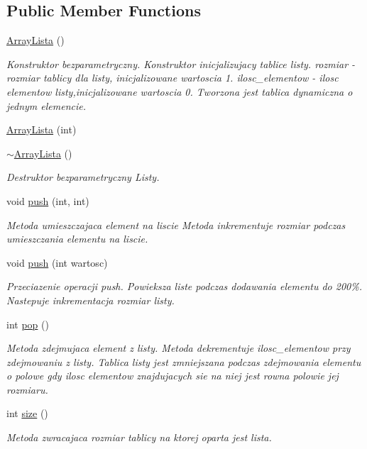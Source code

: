 \subsection*{Public Member Functions}
\begin{DoxyCompactItemize}
\item 
\hyperlink{a00008_a645d18dcf43d2f3397d0ba90f5d8d0b4}{Array\+Lista} ()
\begin{DoxyCompactList}\small\item\em Konstruktor bezparametryczny. Konstruktor inicjalizujacy tablice listy. rozmiar -\/ rozmiar tablicy dla listy, inicjalizowane wartoscia 1. ilosc\+\_\+elementow -\/ ilosc elementow listy,inicjalizowane wartoscia 0. Tworzona jest tablica dynamiczna o jednym elemencie. \end{DoxyCompactList}\item 
\hyperlink{a00008_a0bf8b1be3beb5a7783df8fe555e24e6c}{Array\+Lista} (int)
\item 
\hyperlink{a00008_ab502f9c0ea71ec66954ebe675100b9ce}{$\sim$\+Array\+Lista} ()
\begin{DoxyCompactList}\small\item\em Destruktor bezparametryczny Listy. \end{DoxyCompactList}\item 
void \hyperlink{a00008_a473a71ed888097c7b14bb70cbf7eecd6}{push} (int, int)
\begin{DoxyCompactList}\small\item\em Metoda umieszczajaca element na liscie Metoda inkrementuje rozmiar podczas umieszczania elementu na liscie. \end{DoxyCompactList}\item 
void \hyperlink{a00008_a1d194e2d2e54114ef939d7fe64508840}{push} (int wartosc)
\begin{DoxyCompactList}\small\item\em Przeciazenie operacji push. Powieksza liste podczas dodawania elementu do 200\%. Nastepuje inkrementacja rozmiar listy. \end{DoxyCompactList}\item 
int \hyperlink{a00008_ae76ea59ccac91abd264cf108489d3105}{pop} ()
\begin{DoxyCompactList}\small\item\em Metoda zdejmujaca element z listy. Metoda dekrementuje ilosc\+\_\+elementow przy zdejmowaniu z listy. Tablica listy jest zmniejszana podczas zdejmowania elementu o polowe gdy ilosc elementow znajdujacych sie na niej jest rowna polowie jej rozmiaru. \end{DoxyCompactList}\item 
int \hyperlink{a00008_abd7b74aa6ee7e7c1a454ec32b3aed86e}{size} ()
\begin{DoxyCompactList}\small\item\em Metoda zwracajaca rozmiar tablicy na ktorej oparta jest lista. \end{DoxyCompactList}\end{DoxyCompactItemize}


